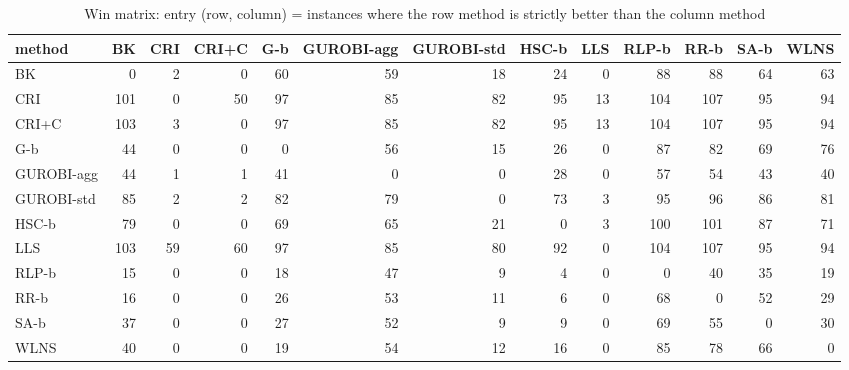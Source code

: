 \begin{table}[htbp]
\centering
\small
\caption{Win matrix: entry (row, column) = instances where the row method is strictly better than the column method}
\label{tab:E4a_equal_budgets_b1_wins}
\begin{tabular}{lrrrrrrrrrrrr}
\toprule
method & BK & CRI & CRI+C & G-b & GUROBI-agg & GUROBI-std & HSC-b & LLS & RLP-b & RR-b & SA-b & WLNS \\
\midrule
BK & 0 & 2 & 0 & 60 & 59 & 18 & 24 & 0 & 88 & 88 & 64 & 63 \\
CRI & 101 & 0 & 50 & 97 & 85 & 82 & 95 & 13 & 104 & 107 & 95 & 94 \\
CRI+C & 103 & 3 & 0 & 97 & 85 & 82 & 95 & 13 & 104 & 107 & 95 & 94 \\
G-b & 44 & 0 & 0 & 0 & 56 & 15 & 26 & 0 & 87 & 82 & 69 & 76 \\
GUROBI-agg & 44 & 1 & 1 & 41 & 0 & 0 & 28 & 0 & 57 & 54 & 43 & 40 \\
GUROBI-std & 85 & 2 & 2 & 82 & 79 & 0 & 73 & 3 & 95 & 96 & 86 & 81 \\
HSC-b & 79 & 0 & 0 & 69 & 65 & 21 & 0 & 3 & 100 & 101 & 87 & 71 \\
LLS & 103 & 59 & 60 & 97 & 85 & 80 & 92 & 0 & 104 & 107 & 95 & 94 \\
RLP-b & 15 & 0 & 0 & 18 & 47 & 9 & 4 & 0 & 0 & 40 & 35 & 19 \\
RR-b & 16 & 0 & 0 & 26 & 53 & 11 & 6 & 0 & 68 & 0 & 52 & 29 \\
SA-b & 37 & 0 & 0 & 27 & 52 & 9 & 9 & 0 & 69 & 55 & 0 & 30 \\
WLNS & 40 & 0 & 0 & 19 & 54 & 12 & 16 & 0 & 85 & 78 & 66 & 0 \\
\bottomrule
\end{tabular}
\end{table}
